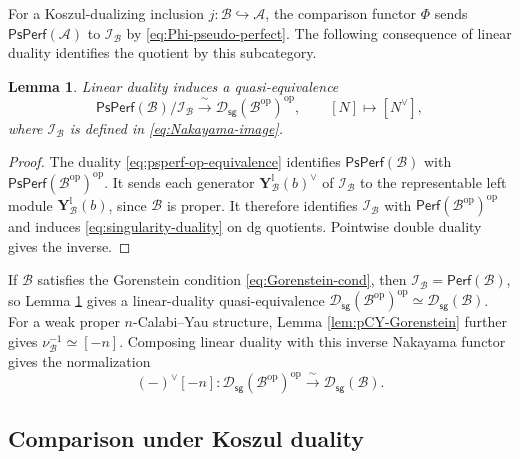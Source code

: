 \documentclass[11pt,letterpaper,reqno]{amsart}
\theoremstyle{plain}
\newtheorem{lemma}[lemma]{Lemma}
\theoremstyle{definition}
\theoremstyle{plain}
\theoremstyle{definition}
\numberwithin{equation}{section}
\begin{document}
For a Koszul-dualizing inclusion $j:\mathscr B\hookrightarrow\mathscr A$, the comparison functor $\Phi$ sends $\mathsf{PsPerf}(\mathscr A)$ to $\mathscr I_{\mathscr B}$ by \eqref{eq:Phi-pseudo-perfect}.
The following consequence of linear duality identifies the quotient by this subcategory.

\begin{lemma}\label{lem:Dsg-op-op}
Linear duality induces a quasi-equivalence
\begin{equation}\label{eq:singularity-duality}
\mathsf{PsPerf}(\mathscr B)/\mathscr I_{\mathscr B}
\xrightarrow{\;\sim\;}
\mathscr D_{\mathsf{sg}}(\mathscr B^{\mathrm{op}})^{\mathrm{op}},
\qquad [N]\longmapsto[N^\vee],
\end{equation}
where $\mathscr I_{\mathscr B}$ is defined in \eqref{eq:Nakayama-image}.
\end{lemma}
\begin{proof}
The duality \eqref{eq:psperf-op-equivalence} identifies $\mathsf{PsPerf}(\mathscr B)$ with $\mathsf{PsPerf}(\mathscr B^{\mathrm{op}})^{\mathrm{op}}$.
It sends each generator $\mathbf Y_{\mathscr B}^{\mathrm l}(b)^\vee$ of $\mathscr I_{\mathscr B}$ to the representable left module $\mathbf Y_{\mathscr B}^{\mathrm l}(b)$, since $\mathscr B$ is proper.
It therefore identifies $\mathscr I_{\mathscr B}$ with $\mathsf{Perf}(\mathscr B^{\mathrm{op}})^{\mathrm{op}}$ and induces \eqref{eq:singularity-duality} on dg quotients.
Pointwise double duality gives the inverse.
\end{proof}

If $\mathscr B$ satisfies the Gorenstein condition \eqref{eq:Gorenstein-cond}, then $\mathscr I_{\mathscr B}=\mathsf{Perf}(\mathscr B)$, so Lemma \ref{lem:Dsg-op-op} gives a linear-duality quasi-equivalence $\mathscr D_{\mathsf{sg}}(\mathscr B^{\mathrm{op}})^{\mathrm{op}}\simeq\mathscr D_{\mathsf{sg}}(\mathscr B)$.
For a weak proper $n$-Calabi--Yau structure, Lemma \ref{lem:pCY-Gorenstein} further gives $\nu_{\mathscr B}^{-1}\simeq[-n]$.
Composing linear duality with this inverse Nakayama functor gives the normalization
\begin{equation}\label{eq:CY-singularity-duality}
(-)^\vee[-n]:
\mathscr D_{\mathsf{sg}}(\mathscr B^{\mathrm{op}})^{\mathrm{op}}
\xrightarrow{\;\sim\;}\mathscr D_{\mathsf{sg}}(\mathscr B).
\end{equation}

\subsection{Comparison under Koszul duality}\label{subsec:koszul-comparison}
\end{document}
